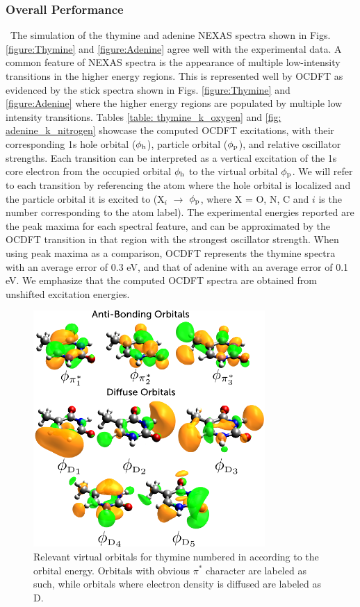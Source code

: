 \documentclass[8.5pt,twoside,twocolumn]{article}
\begin{document}
\subsubsection{Overall Performance}
\ The simulation of the thymine and adenine NEXAS spectra shown in Figs.\ref{figure:Thymine} and \ref{figure:Adenine} agree well with the experimental data. A common feature of NEXAS spectra is the appearance of multiple low-intensity transitions in the higher energy regions. This is represented well by OCDFT as evidenced by the stick spectra shown in Figs. \ref{figure:Thymine} and \ref{figure:Adenine} where the higher energy regions are populated by multiple low intensity transitions. Tables \ref{table: thymine_k_oxygen} and \ref{fig: adenine_k_nitrogen} showcase the computed OCDFT excitations, with their corresponding 1s hole orbital ($\phi_{\rm h}$), particle orbital ($\phi_{\rm p}$), and relative oscillator strengths. Each transition can be interpreted as a vertical excitation of the 1s core electron from the occupied orbital $\phi_{\rm h}$ to the virtual orbital $\phi_{\rm p}$. We will refer to each transition by referencing the atom where the hole orbital is localized and the particle orbital it is excited to (X$_i$ $\rightarrow$ $\phi_{\rm p}$, where X = O, N, C and $i$ is the number corresponding to the atom label).  The experimental energies reported are the peak maxima for each spectral feature, and can be approximated by the OCDFT transition in that region with the strongest oscillator strength. When using peak maxima as a comparison, OCDFT represents the thymine spectra with an average error of 0.3 eV, and that of adenine with an average error of 0.1 eV. We emphasize that the computed OCDFT spectra are obtained from unshifted excitation energies. 
\begin{figure}[!b]
\centering
\includegraphics[width=8.8cm]{ThymineVirtuals.png}
\caption{Relevant virtual orbitals for thymine numbered in according to the orbital energy. Orbitals with obvious $\pi^*$ character are labeled as such, while orbitals where electron density is diffused  are labeled as D.}
\label{fig:thyminevirtuals}
\end{figure}
\end{document}
